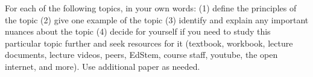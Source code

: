\documentclass[addpoints,12pt]{exam}
\newcommand{\Soln}[1]{{\color{red}{SOLUTION: #1}}}%
\begin{document}
\begin{questions}
    \newpage
    
 For each of the following topics, in your own words: (1) define the principles of the topic (2) give one example of the topic (3) identify and explain any important nuances about the topic (4) decide for yourself if you need to study this particular topic further and seek resources for it (textbook, workbook, lecture documents, lecture videos, peers, EdStem, course staff, youtube, the open internet, and more). Use additional paper as needed.
\end{questions}
\end{document}
